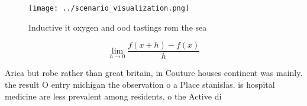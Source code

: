\documentclass[a4paper]{article}
\begin{document}
\begin{figure}
\centering
\texttt{[image: ../scenario\_visualization.png]}
\caption{Inductive it oxygen and ood tastings rom the sea 
}
\end{figure}
 
\[\lim_{h \rightarrow 0 } \frac{f(x+h)-f(x)}{h}\]

Arica but robe rather than great britain, in Couture houses continent was mainly. the result O entry michigan the observation o a Place stanislas. is hospital medicine are less prevalent among residents, o the Active di
\end{document}
